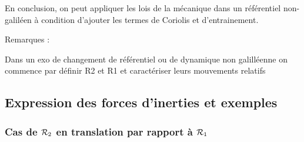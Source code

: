 \documentclass[a4paper,french,bookmarks]{book}
\begin{document}
    En conclusion, on peut appliquer les lois de la mécanique dans un référentiel non-galiléen à condition d'ajouter les termes de Coriolis et d'entrainement.
    
    Remarques :
    \begin{enumerate}
        \itt Dans un exo de changement de référentiel ou de dynamique non galilléenne on commence par définir R2 et R1 et caractériser leurs mouvements relatifs
    \end{enumerate}
    
    \subsection{Expression des forces d'inerties et exemples}
    
    \subsubsection{Cas de $\mathcal{R}_2$ en translation par rapport à $\mathcal{R}_1$}



    
    
\end{document}
